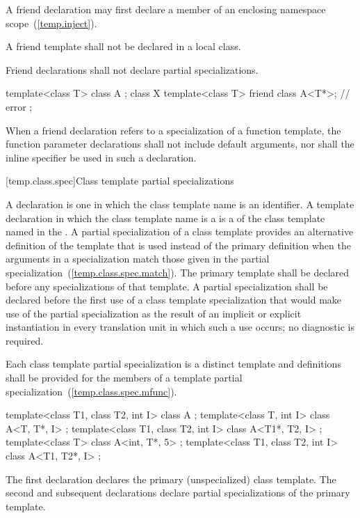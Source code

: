 \pnum
\begin{note}
A friend declaration may first declare a member of an enclosing namespace scope~(\ref{temp.inject}).
\end{note}

\pnum
A friend template shall not be declared in a local class.

\pnum
Friend declarations shall not declare partial specializations.
\begin{example}

\begin{codeblock}
template<class T> class A { };
class X {
  template<class T> friend class A<T*>; // error
};
\end{codeblock}
\end{example}

\pnum
When a friend declaration refers to a specialization of a function
template, the function parameter declarations shall not include
default arguments, nor shall the inline specifier be used in such a
declaration.

[temp.class.spec]{Class template partial specializations}

\pnum
{}%
%
A
declaration is one in which the class template name is an
identifier.
A template declaration in which the class template name is a
is a
of the class template named in the
.
A partial specialization of a class template provides an alternative definition
of the template that is used instead of the primary definition when the
arguments in a specialization match those given in the partial
specialization~(\ref{temp.class.spec.match}).
The primary template shall be declared before any specializations of
that template.
A partial specialization shall be declared before the first use of a class template
specialization that would make use of the partial specialization as the result of
an implicit or explicit instantiation in every translation unit in which such a use
occurs; no diagnostic is required.

\pnum
Each class template partial specialization is a distinct template and
definitions shall be provided for the members of a template partial
specialization~(\ref{temp.class.spec.mfunc}).

\pnum
\begin{example}
\begin{codeblock}
template<class T1, class T2, int I> class A             { };
template<class T, int I>            class A<T, T*, I>   { };
template<class T1, class T2, int I> class A<T1*, T2, I> { };
template<class T>                   class A<int, T*, 5> { };
template<class T1, class T2, int I> class A<T1, T2*, I> { };
\end{codeblock}

The first declaration declares the primary (unspecialized) class template.
The second and subsequent declarations declare partial specializations of
the primary template.
\end{example}

